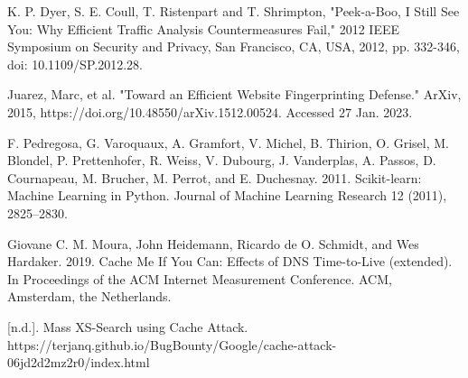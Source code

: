 \begin{thebibliography}{1}
K. P. Dyer, S. E. Coull, T. Ristenpart and T. Shrimpton, "Peek-a-Boo, I Still See You: Why Efficient Traffic Analysis Countermeasures Fail," 2012 IEEE Symposium on Security and Privacy, San Francisco, CA, USA, 2012, pp. 332-346, doi: 10.1109/SP.2012.28.


Juarez, Marc, et al. "Toward an Efficient Website Fingerprinting Defense." ArXiv, 2015,  https://doi.org/10.48550/arXiv.1512.00524. Accessed 27 Jan. 2023.

F. Pedregosa, G. Varoquaux, A. Gramfort, V. Michel, B. Thirion, O. Grisel, M. Blondel, P. Prettenhofer, R. Weiss, V. Dubourg, J. Vanderplas, A. Passos, D. Cournapeau, M. Brucher, M. Perrot, and E. Duchesnay. 2011. Scikit-learn: Machine Learning in Python. Journal of Machine Learning Research 12 (2011), 2825–2830.

Giovane C. M. Moura, John Heidemann, Ricardo de O. Schmidt, and Wes Hardaker. 2019. Cache Me If You Can: Effects of DNS Time-to-Live (extended). In Proceedings of the ACM Internet Measurement Conference. ACM, Amsterdam, the Netherlands.

[n.d.]. Mass XS-Search using Cache Attack. https://terjanq.github.io/BugBounty/Google/cache-attack-06jd2d2mz2r0/index.html





\end{thebibliography}